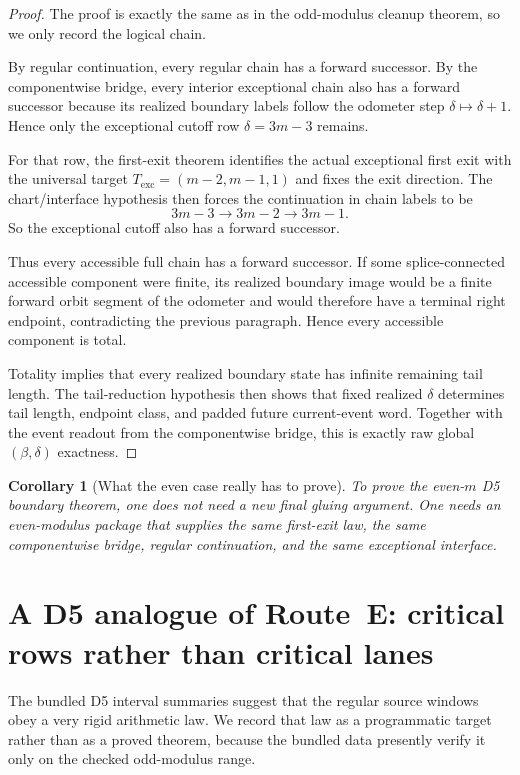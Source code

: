 \documentclass[11pt]{article}
\newtheorem{corollary}{Corollary}
\begin{document}
\begin{proof}
The proof is exactly the same as in the odd-modulus cleanup theorem, so we only
record the logical chain.

By regular continuation, every regular chain has a forward successor. By the
componentwise bridge, every interior exceptional chain also has a forward
successor because its realized boundary labels follow the odometer step
$\delta\mapsto\delta+1$. Hence only the exceptional cutoff row
$\delta=3m-3$ remains.

For that row, the first-exit theorem identifies the actual exceptional first
exit with the universal target $T_{\mathrm{exc}}=(m-2,m-1,1)$ and fixes the exit
direction. The chart/interface hypothesis then forces the continuation in chain
labels to be
\[
3m-3 \to 3m-2 \to 3m-1.
\]
So the exceptional cutoff also has a forward successor.

Thus every accessible full chain has a forward successor. If some
splice-connected accessible component were finite, its realized boundary image
would be a finite forward orbit segment of the odometer and would therefore
have a terminal right endpoint, contradicting the previous paragraph. Hence
every accessible component is total.

Totality implies that every realized boundary state has infinite remaining tail
length. The tail-reduction hypothesis then shows that fixed realized $\delta$
determines tail length, endpoint class, and padded future current-event word.
Together with the event readout from the componentwise bridge, this is exactly
raw global $(\beta,\delta)$ exactness.
\end{proof}

\begin{corollary}[What the even case really has to prove]
\label{cor:realwork}
To prove the even-$m$ D5 boundary theorem, one does \emph{not} need a new final
gluing argument. One needs an even-modulus package that supplies the same
first-exit law, the same componentwise bridge, regular continuation, and the
same exceptional interface.
\end{corollary}

\section{A D5 analogue of Route~E: critical rows rather than critical lanes}

The bundled D5 interval summaries suggest that the regular source windows obey a
very rigid arithmetic law. We record that law as a programmatic target rather
than as a proved theorem, because the bundled data presently verify it only on
the checked odd-modulus range.
\end{document}
